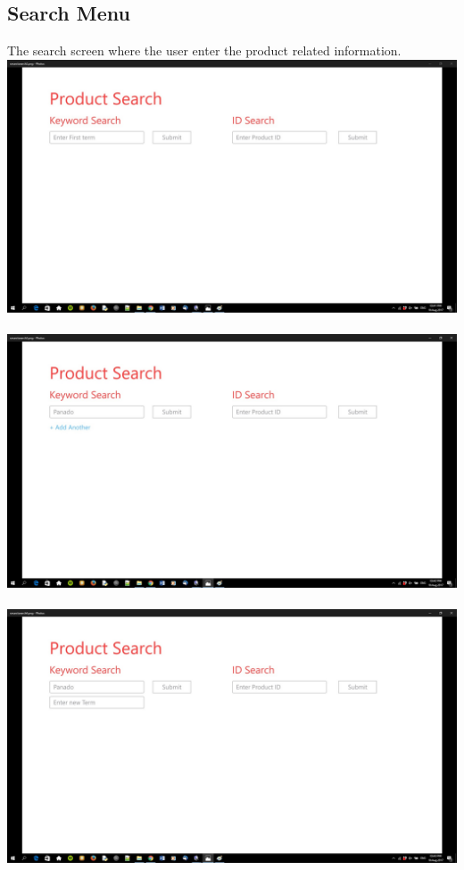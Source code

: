 \documentclass[a4paper,10pt]{article}
\begin{document}
	\subsection{Search Menu}
	The search screen where the user enter the product related information. \\
	{\centering\includegraphics[width=15cm, scale=0.5]{smarctsearch2.jpg}} \\ \\
	{\centering\includegraphics[width=15cm, scale=0.5]{smarctsearch3.jpg}} \\ \\
	{\centering\includegraphics[width=15cm, scale=0.5]{smarctsearch4.jpg}} \\ \\
\end{document}
